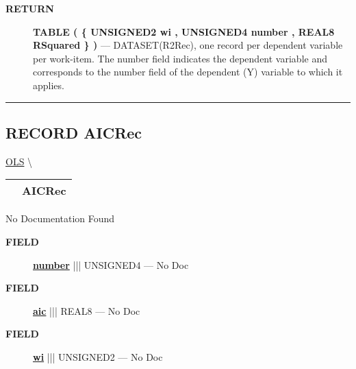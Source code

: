 \par
\begin{description}
\item [\colorbox{tagtype}{\color{white} \textbf{\textsf{RETURN}}}] \textbf{TABLE ( \{ UNSIGNED2 wi , UNSIGNED4 number , REAL8 RSquared \} )} --- DATASET(R2Rec), one record per dependent variable per work-item. The number field indicates the dependent variable and corresponds to the number field of the dependent (Y) variable to which it applies.
\end{description}




\rule{\linewidth}{0.5pt}
\subsection*{\textsf{\colorbox{headtoc}{\color{white} RECORD}
AICRec}}

\hypertarget{ecldoc:linearregression.ols.aicrec}{}
\hspace{0pt} \hyperlink{ecldoc:linearregression.ols}{OLS} \textbackslash 

{\renewcommand{\arraystretch}{1.5}
\begin{tabularx}{\textwidth}{|>{\raggedright\arraybackslash}l|X|}
\hline
\hspace{0pt}\mytexttt{\color{red} } & \textbf{AICRec} \\
\hline
\end{tabularx}
}

\par





No Documentation Found







\par
\begin{description}
\item [\colorbox{tagtype}{\color{white} \textbf{\textsf{FIELD}}}] \textbf{\underline{number}} ||| UNSIGNED4 --- No Doc
\item [\colorbox{tagtype}{\color{white} \textbf{\textsf{FIELD}}}] \textbf{\underline{aic}} ||| REAL8 --- No Doc
\item [\colorbox{tagtype}{\color{white} \textbf{\textsf{FIELD}}}] \textbf{\underline{wi}} ||| UNSIGNED2 --- No Doc
\end{description}





